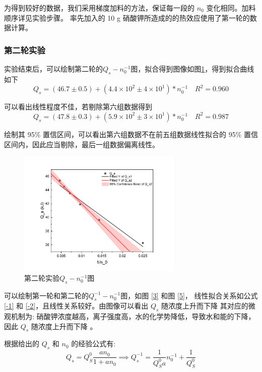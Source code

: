 \documentclass[cn,hazy,pku,12pt,normal,math=newtx,cite=super]{elegantnote}
\begin{document}
为得到较好的数据，我们采用梯度加料的方法，保证每一段的 $n_0$ 变化相同。加料顺序详见实验步骤。
率先加入的 10 g 硝酸钾所造成的的热效应使用了第一轮的数据计算。
\subsubsection[short]{第二轮实验}

实验结束后，可以绘制第二轮的$Q_s-n_0^{-1}$图，拟合得到图像如图\ref{8}，得到拟合曲线如下
\begin{equation}
    Q_s = (46.7 \pm 0.5) + (4.4 \times 10^2 \pm 4 \times 10^1) * n_0^{-1} \quad R^2=0.960
\end{equation}

可以看出线性程度不佳，若剔除第六组数据得到
\begin{equation}
    Q_s = (47.8 \pm 0.3) + (5.9 \times 10^2 \pm 3 \times 10^1) * n_0^{-1} \quad R^2=0.987
\end{equation}

绘制其 95\% 置信区间，可以看出第六组数据不在前五组数据线性拟合的 95\% 置信区间内，因此应当剔除，最后一组数据偏离线性。
\begin{figure}[htbp]
    \centering
    \includegraphics[width = 0.70\textwidth]{image/Graph12.png}
    \caption{第二轮实验$Q_s-n_0^{-1}$图}\label{8}
\end{figure}


可以绘制第一轮和第二轮的$Q_s^{-1}-n_0^{-1}$图，如图 \ref{3} 和图 \ref{5}，
线性拟合关系如公式 \ref{-1} 和 \ref{-2}，且线性关系较好。由图像可以看出 $Q_s$ 随浓度上升而下降
其对应的微观机制为: 硝酸钾浓度越高，离子强度高，水的化学势降低，导致水和能的下降，因此 $Q_s$ 随浓度上升而下降
。

根据给出的 $Q_s$ 和 $n_0$ 的经验公式有:
\begin{equation}
    Q_s = Q_S^0 \frac{an_0}{1+an_0} \implies Q_s^{-1} = \frac{1}{Q_S^0 a} n_0^{-1} +\frac{1}{Q_S^0}
\end{equation}
\end{document}

